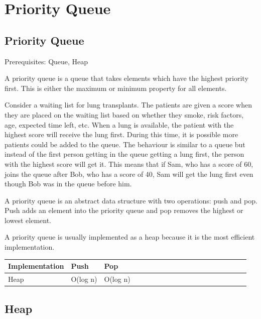 \documentclass[11pt,oneside]{book}
\begin{document}
    \chapter{ Priority Queue }
        \section{ Priority Queue }
        

Prerequisites: Queue, Heap

A priority queue is a queue that takes elements which have the highest priority first. This is either the maximum or minimum property for all elements.

Consider a waiting list for lung transplants. The patients are given a score when they are placed on the waiting list based on whether they smoke, risk factors, age, expected time left, etc. When a lung is available, the patient with the highest score will receive the lung first. During this time, it is possible more patients could be added to the queue. The behaviour is similar to a queue but instead of the first person getting in the queue getting a lung first, the person with the highest score will get it. This means that if Sam, who  has a score of 60, joins the queue after Bob, who has a score of 40, Sam will get the lung first even though Bob was in the queue before him.

A priority queue is an abstract data structure with two operations: push and pop. Push adds an element into the priority queue and pop removes the highest or lowest element.

A priority queue is usually implemented as a heap because it is the most efficient implementation.


        

\begin{center}\begin{tabulary}{0.4\linewidth}{|l|l|l|l|l|l|l|l|l|l|l|l|l|l|l|l|l|l|l}\hline


  Implementation &
  Push &
  Pop\\
\hline


  Heap &
  O(log n) &
  O(log n)\\

\hline\end{tabulary}\end{center}


        \section{ Heap }
        
\end{document}
